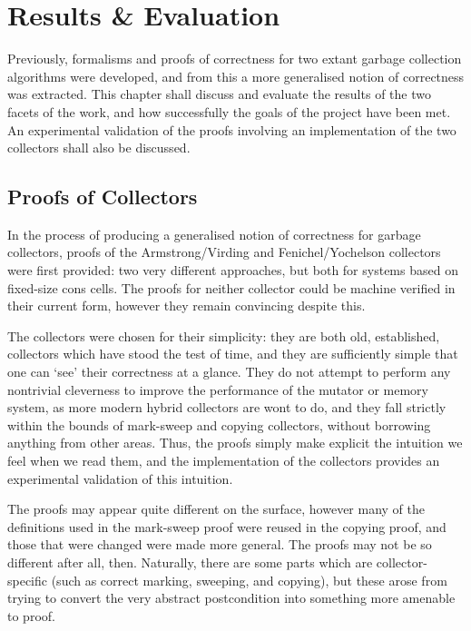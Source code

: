 \chapter{Results \& Evaluation}
\label{sec:results}

Previously, formalisms and proofs of correctness for two extant
garbage collection algorithms were developed, and from this a more
generalised notion of correctness was extracted. This chapter shall
discuss and evaluate the results of the two facets of the work, and
how successfully the goals of the project have been met. An
experimental validation of the proofs involving an implementation of
the two collectors shall also be discussed.

\section{Proofs of Collectors}
\label{sec:results-collectors}

In the process of producing a generalised notion of correctness for
garbage collectors, proofs of the Armstrong/Virding and
Fenichel/Yochelson collectors were first provided: two very different
approaches, but both for systems based on fixed-size cons cells. The
proofs for neither collector could be machine verified in their
current form, however they remain convincing despite this.

The collectors were chosen for their simplicity: they are both old,
established, collectors which have stood the test of time, and they
are sufficiently simple that one can `see' their correctness at a
glance. They do not attempt to perform any nontrivial cleverness to
improve the performance of the mutator or memory system, as more
modern hybrid collectors are wont to do, and they fall strictly within
the bounds of mark-sweep and copying collectors, without borrowing
anything from other areas. Thus, the proofs simply make explicit the
intuition we feel when we read them, and the implementation of the
collectors provides an experimental validation of this intuition.

The proofs may appear quite different on the surface, however many of
the definitions used in the mark-sweep proof were reused in the
copying proof, and those that were changed were made more
general. The proofs may not be so different after all,
then. Naturally, there are some parts which are collector-specific
(such as correct marking, sweeping, and copying), but these arose from
trying to convert the very abstract postcondition into something more
amenable to proof.

